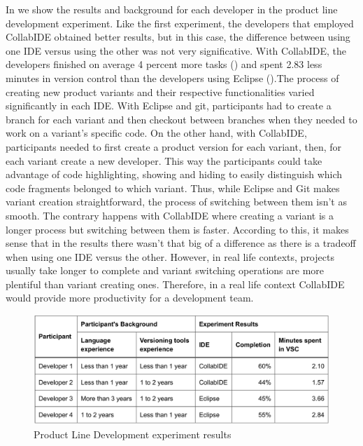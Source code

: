 In  we show the results and background for each developer in the product line development experiment. Like the first experiment, the developers that employed CollabIDE obtained better results, but in this case, the difference between using one IDE versus using the other was not very significative. With CollabIDE, the developers finished on average 4 percent more tasks () and spent 2.83 less minutes in version control than the developers using Eclipse ().The process of creating new product variants and their respective functionalities varied significantly in each IDE. With Eclipse and git, participants had to create a branch for each variant and then checkout between branches when they needed to work on a variant’s specific code. On the other hand, with CollabIDE, participants needed to first create a product version for each variant, then, for each variant create a new developer. This way the participants could take advantage of code highlighting, showing and hiding to easily distinguish which code fragments belonged to which variant. Thus, while Eclipse and Git makes variant creation straightforward, the process of switching between them isn’t as smooth. The contrary happens with CollabIDE where creating a variant is a longer process but switching between them is faster. According to this, it makes sense that in the results there wasn’t that big of a difference as there is a tradeoff when using one IDE versus the other. However, in real life contexts, projects usually take longer to complete and variant switching operations are more plentiful than variant creating ones. Therefore, in a real life context CollabIDE would provide more productivity for a development team.
\begin{figure}[htbp]
  \centering
  \includegraphics[width=1\textwidth]{img/resultsTableProductLine}
  \caption{Product Line Development experiment results}
  \label{fig:resultsTableProductLine}
\end{figure}

